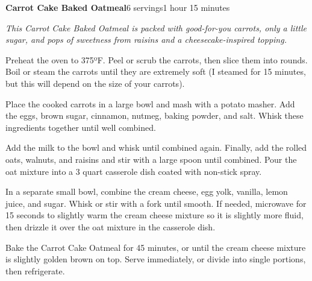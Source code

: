 \documentclass[../recipe-collections/cooking.tex]{subfiles}
\begin{document}
\begin{recipe}{\textbf{Carrot Cake Baked Oatmeal}}{6 servings}{1 hour 15 minutes}

  \freeform{}\textit{This Carrot Cake Baked Oatmeal is packed with 
  good-for-you carrots, only a little sugar, and pops of sweetness 
  from raisins and a cheesecake-inspired topping. }


  Preheat the oven to 375ºF. Peel or scrub the carrots, then slice them 
  into rounds. Boil or steam the carrots until they are extremely soft 
  (I steamed for 15 minutes, but this will depend on the size of your carrots).


  Place the cooked carrots in a large bowl and mash with a potato masher. 
  Add the eggs, brown sugar, cinnamon, nutmeg, baking powder, and salt. 
  Whisk these ingredients together until well combined.


  Add the milk to the bowl and whisk until combined again. Finally, add the 
  rolled oats, walnuts, and raisins and stir with a large spoon until combined. 
  Pour the oat mixture into a 3 quart casserole dish coated with non-stick spray.


  In a separate small bowl, combine the cream cheese, egg yolk, vanilla, 
  lemon juice, and sugar. Whisk or stir with a fork until smooth. If needed, 
  microwave for 15 seconds to slightly warm the cream cheese mixture so it 
  is slightly more fluid, then drizzle it over the oat mixture in the 
  casserole dish.

  Bake the Carrot Cake Oatmeal for 45 minutes, or until the cream cheese 
  mixture is slightly golden brown on top. Serve immediately, or divide 
  into single portions, then refrigerate.


\end{recipe}
\end{document}
